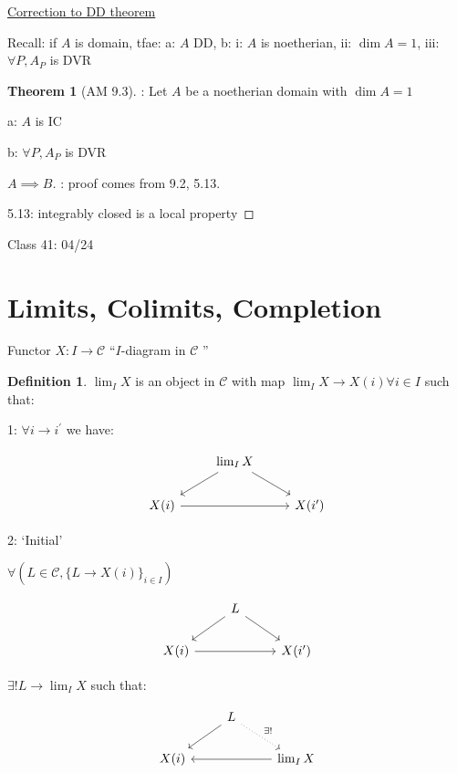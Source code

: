 \documentclass{article}
\theoremstyle{definition}
\newtheorem{definition}{Definition}
\newtheorem{theorem}{Theorem}
\begin{document}
\underline{Correction to DD theorem}

Recall: if \(A\) is domain, tfae: a: \(A\) DD, b: i: \(A\) is noetherian, ii: \(\dim A = 1\), iii: \(\forall P, A_P\) is DVR  

\begin{theorem}
    [AM 9.3]: Let \(A\) be a noetherian domain with \(\dim A = 1\) 

    a: \(A\) is IC

    b: \(\forall P, A_P\) is DVR 
\end{theorem}

\begin{proof}
    [\(A \implies B\)]: proof comes from 9.2, 5.13.

    5.13: integrably closed is a local property

    
\end{proof}

\hrulefill

Class 41: 04/24

\section*{Limits, Colimits, Completion}

Functor \(X : I \to \mathcal{C}\) ``\(I\)-diagram in \(\mathcal{C}\) '' 

\begin{definition}
    \(\lim_{I} X\) is an object in \(\mathcal{C}\) with map \(\lim_{I} X \to X(i) \forall i\in I\) such that:
    
    1: \(\forall i \to i^{\prime} \) we have:
    
    \[
        \begin{tikzcd}
            & \lim_I X \ar[dl] \ar[dr]& \\
            X(i) \ar[rr] & & X(i^{\prime})
        \end{tikzcd}
    \]

    2: `Initial'

    \(\forall (L\in \mathcal{C},\{ L \to X(i) \}_{i\in I} )\)
    
    \[
        \begin{tikzcd}
            & L \ar[dl] \ar[dr] & \\
            X(i) \ar[rr] & & X(i^{\prime})
        \end{tikzcd}
    \]

    \(\exists ! L \to \lim_{I} X\) such that:
    
    \[
        \begin{tikzcd}
            & L \ar[dl] \ar[dr, "\exists!", dotted] & \\
            X(i) & & \lim_I X \ar[ll]
        \end{tikzcd}
    \]
\end{definition}
\end{document}
